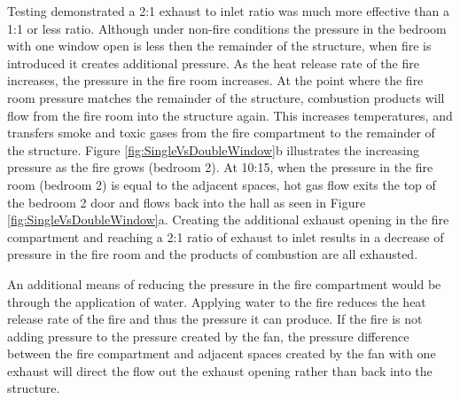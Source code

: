 \documentclass{article}
\begin{document}
Testing demonstrated a 2:1 exhaust to inlet ratio was much more effective than a 1:1 or less ratio. Although under non-fire conditions the pressure in the bedroom with one window open is less then the remainder of the structure, when fire is introduced it creates additional pressure. As the heat release rate of the fire increases, the pressure in the fire room increases. At the point where the fire room pressure matches the remainder of the structure, combustion products will flow from the fire room into the structure again. This increases temperatures, and transfers smoke and toxic gases from the fire compartment to the remainder of the structure. Figure \ref{fig:SingleVsDoubleWindow}b illustrates the increasing pressure as the fire grows (bedroom 2). At 10:15, when the pressure in the fire room (bedroom 2) is equal to the adjacent spaces, hot gas flow exits the top of the bedroom 2 door and flows back into the hall as seen in  Figure \ref{fig:SingleVsDoubleWindow}a. Creating the additional exhaust opening in the fire compartment and reaching a 2:1 ratio of exhaust to inlet results in a decrease of pressure in the fire room and the products of combustion are all exhausted. 

An additional means of reducing the pressure in the fire compartment would be through the application of water. Applying water to the fire reduces the heat release rate of the fire and thus the pressure it can produce. If the fire is not adding pressure to the pressure created by the fan, the pressure difference between the fire compartment and adjacent spaces created by the fan with one exhaust will direct the flow out the exhaust opening rather than back into the structure. 
\end{document}
